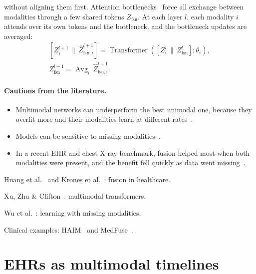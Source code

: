 without aligning them first. Attention bottlenecks~\cite{nagrani2021attention}
force all exchange between modalities through a few shared tokens
$Z_{\text{fsn}}$. At each layer $l$, each modality $i$ attends over its own tokens
and the bottleneck, and the bottleneck updates are averaged:
\begin{equation}
  \begin{gathered}
    \left[Z_i^{l+1} \,\|\, \hat{Z}_{\text{fsn},i}^{l+1}\right]
      = \operatorname{Transformer}\left(\left[Z_i^{l} \,\|\, Z_{\text{fsn}}^{l}\right]; \theta_i\right), \\
    Z_{\text{fsn}}^{l+1} = \operatorname{Avg}_i\, \hat{Z}_{\text{fsn},i}^{l+1}.
  \end{gathered}
\end{equation}

\paragraph{Cautions from the literature.}
\begin{itemize}
  \item Multimodal networks can underperform the best unimodal one, because they
        overfit more and their modalities learn at different
        rates~\cite{wang2020what,huang2022modality}.
  \item Models can be sensitive to missing modalities~\cite{ma2022multimodal}.
  \item In a recent EHR and chest X-ray benchmark, fusion helped most when both
        modalities were present, and the benefit fell quickly as data went
        missing~\cite{yin2026when}.
\end{itemize}

\begin{furtherreading}
  \item Huang et al.~\cite{huang2020fusion} and Krones et al.~\cite{krones2025review}:
        fusion in healthcare.
  \item Xu, Zhu \& Clifton~\cite{xu2023multimodal}: multimodal transformers.
  \item Wu et al.~\cite{wu2026deep}: learning with missing modalities.
  \item Clinical examples: HAIM~\cite{soenksen2022integrated} and
        MedFuse~\cite{hayat2022medfuse}.
\end{furtherreading}


\section{EHRs as multimodal timelines}
\label{sec:ehr}

